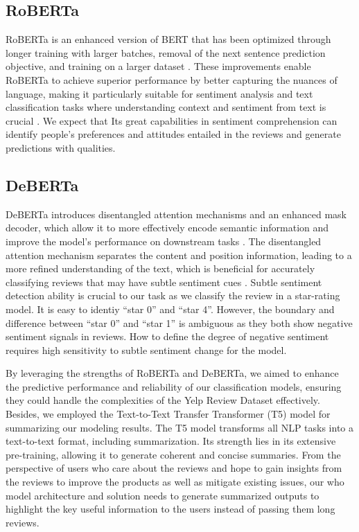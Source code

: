 \documentclass[12pt]{article}
\begin{document}
\subsection{RoBERTa}
RoBERTa is an enhanced version of BERT that has been optimized through longer training with larger batches, removal of the next sentence prediction objective, and training on a larger dataset \citep{liu2012sentiment}. These improvements enable RoBERTa to achieve superior performance by better capturing the nuances of language, making it particularly suitable for sentiment analysis and text classification tasks where understanding context and sentiment from text is crucial \citep{liu2012sentiment}. We expect that Its great capabilities in sentiment comprehension can identify people’s preferences and attitudes entailed in the reviews and generate predictions with qualities.

\subsection{DeBERTa}
DeBERTa introduces disentangled attention mechanisms and an enhanced mask decoder, which allow it to more effectively encode semantic information and improve the model's performance on downstream tasks \citep{he2020deberta}. The disentangled attention mechanism separates the content and position information, leading to a more refined understanding of the text, which is beneficial for accurately classifying reviews that may have subtle sentiment cues \citep{he2020deberta}. Subtle sentiment detection ability is crucial to our task as we classify the review in a star-rating model. It is easy to identiy “star 0” and “star 4”. However, the boundary and difference between “star 0” and “star 1” is ambiguous as they both show negative sentiment signals in reviews. How to define the degree of negative sentiment requires high sensitivity to subtle sentiment change for the model.

By leveraging the strengths of RoBERTa and DeBERTa, we aimed to enhance the predictive performance and reliability of our classification models, ensuring they could handle the complexities of the Yelp Review Dataset effectively. Besides, we employed the Text-to-Text Transfer Transformer (T5) model for summarizing our modeling results. The T5 model transforms all NLP tasks into a text-to-text format, including summarization. Its strength lies in its extensive pre-training, allowing it to generate coherent and concise summaries. From the perspective of users who care about the reviews and hope to gain insights from the reviews to improve the products as well as mitigate existing issues, our who model architecture and solution needs to generate summarized outputs to highlight the key useful information to the users instead of passing them long reviews.
\end{document}
